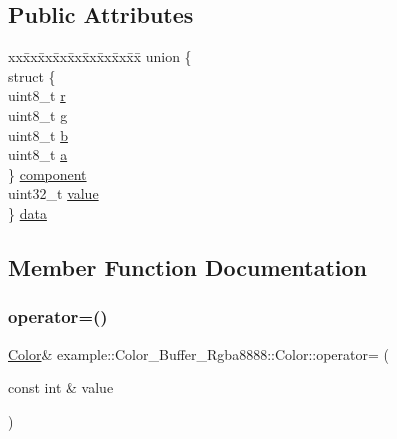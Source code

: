 \subsection*{Public Attributes}
\begin{DoxyCompactItemize}
\item 
\begin{tabbing}
xx\=xx\=xx\=xx\=xx\=xx\=xx\=xx\=xx\=\kill
union \{\\
\>struct \{\\
\>\>uint8\_t \mbox{\hyperlink{structexample_1_1_color___buffer___rgba8888_1_1_color_a3ae8419af50bed867580b5ca28b9e254}{r}}\\
\>\>uint8\_t \mbox{\hyperlink{structexample_1_1_color___buffer___rgba8888_1_1_color_a02b8df3c9800b6d9efab7872ead00da1}{g}}\\
\>\>uint8\_t \mbox{\hyperlink{structexample_1_1_color___buffer___rgba8888_1_1_color_a9213fba01a28ef7dbe871fe2669a0226}{b}}\\
\>\>uint8\_t \mbox{\hyperlink{structexample_1_1_color___buffer___rgba8888_1_1_color_ac93fe62cb2f57a798639f74a547293be}{a}}\\
\>\} \mbox{\hyperlink{structexample_1_1_color___buffer___rgba8888_1_1_color_ac96a7902c0c3c9057d7b7305583998c1}{component}}\\
\>uint32\_t \mbox{\hyperlink{structexample_1_1_color___buffer___rgba8888_1_1_color_aa8c3f5e3038dd7743aab9592023418e4}{value}}\\
\} \mbox{\hyperlink{structexample_1_1_color___buffer___rgba8888_1_1_color_ad72a4b9a37e96fe39fd68d22459e0239}{data}}\\

\end{tabbing}\end{DoxyCompactItemize}


\subsection{Member Function Documentation}
\mbox{\label{structexample_1_1_color___buffer___rgba8888_1_1_color_ada91a7b49ff32dc823e5cf733fc94b55}} 
\subsubsection{\texorpdfstring{operator=()}{operator=()}}
{\footnotesize\ttfamily \mbox{\hyperlink{structexample_1_1_color___buffer___rgba8888_1_1_color}{Color}}\& example\+::\+Color\+\_\+\+Buffer\+\_\+\+Rgba8888\+::\+Color\+::operator= (\begin{DoxyParamCaption}\item[{const int \&}]{value }\end{DoxyParamCaption})\hspace{0.3cm}{\ttfamily [inline]}}

